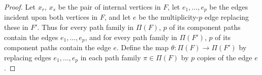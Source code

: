 \documentclass[10pt,a4paper]{amsart}
\newcommand{\ctr}[1]{{x}_{#1}}
\begin{document}
\begin{proof}
    Let $\ctr r$, $\ctr s$ be the pair of internal vertices in $F$, let $e_1, \dots, e_p$ be the edges incident upon both vertices
    in $F$, and let $e$ be the multiplicity-$p$ edge replacing these in $F'$.
    Thus for every path family 
    in $\Pi(F)$,
    $p$ of its component paths contain the edges $e_1,\dotsc, e_p$,
    and for every path family in $\Pi(F')$,
    $p$ of its component paths contain the edge $e$.
    Define the map 
        $\theta : \Pi(F) \rightarrow \Pi(F')$
        by replacing edges $e_1,\dotsc, e_p$ in each path family $\pi \in \Pi(F)$ by $p$ copies of the edge $e$.
        

\end{proof}
\end{document}
